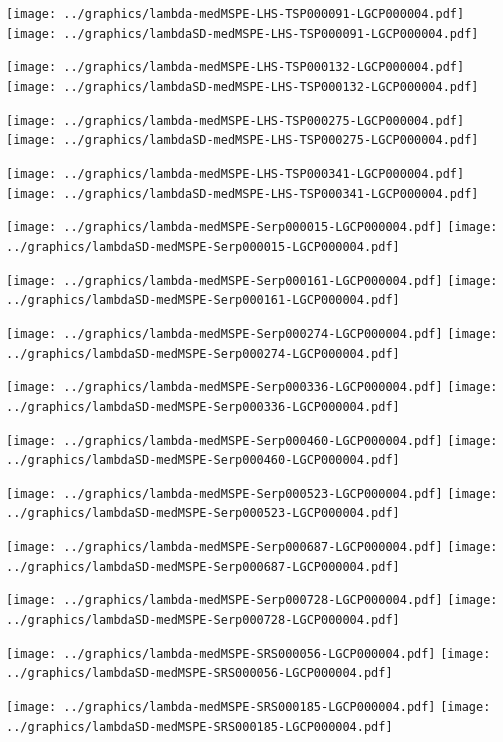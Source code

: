 \documentclass[review]{elsarticle}
\begin{document}
\texttt{[image: ../graphics/lambda-medMSPE-LHS-TSP000091-LGCP000004.pdf]}
\texttt{[image: ../graphics/lambdaSD-medMSPE-LHS-TSP000091-LGCP000004.pdf]}

\texttt{[image: ../graphics/lambda-medMSPE-LHS-TSP000132-LGCP000004.pdf]}
\texttt{[image: ../graphics/lambdaSD-medMSPE-LHS-TSP000132-LGCP000004.pdf]}

\texttt{[image: ../graphics/lambda-medMSPE-LHS-TSP000275-LGCP000004.pdf]}
\texttt{[image: ../graphics/lambdaSD-medMSPE-LHS-TSP000275-LGCP000004.pdf]}

\texttt{[image: ../graphics/lambda-medMSPE-LHS-TSP000341-LGCP000004.pdf]}
\texttt{[image: ../graphics/lambdaSD-medMSPE-LHS-TSP000341-LGCP000004.pdf]}

\texttt{[image: ../graphics/lambda-medMSPE-Serp000015-LGCP000004.pdf]}
\texttt{[image: ../graphics/lambdaSD-medMSPE-Serp000015-LGCP000004.pdf]}

\texttt{[image: ../graphics/lambda-medMSPE-Serp000161-LGCP000004.pdf]}
\texttt{[image: ../graphics/lambdaSD-medMSPE-Serp000161-LGCP000004.pdf]}

\texttt{[image: ../graphics/lambda-medMSPE-Serp000274-LGCP000004.pdf]}
\texttt{[image: ../graphics/lambdaSD-medMSPE-Serp000274-LGCP000004.pdf]}

\texttt{[image: ../graphics/lambda-medMSPE-Serp000336-LGCP000004.pdf]}
\texttt{[image: ../graphics/lambdaSD-medMSPE-Serp000336-LGCP000004.pdf]}

\texttt{[image: ../graphics/lambda-medMSPE-Serp000460-LGCP000004.pdf]}
\texttt{[image: ../graphics/lambdaSD-medMSPE-Serp000460-LGCP000004.pdf]}

\texttt{[image: ../graphics/lambda-medMSPE-Serp000523-LGCP000004.pdf]}
\texttt{[image: ../graphics/lambdaSD-medMSPE-Serp000523-LGCP000004.pdf]}

\texttt{[image: ../graphics/lambda-medMSPE-Serp000687-LGCP000004.pdf]}
\texttt{[image: ../graphics/lambdaSD-medMSPE-Serp000687-LGCP000004.pdf]}

\texttt{[image: ../graphics/lambda-medMSPE-Serp000728-LGCP000004.pdf]}
\texttt{[image: ../graphics/lambdaSD-medMSPE-Serp000728-LGCP000004.pdf]}

\texttt{[image: ../graphics/lambda-medMSPE-SRS000056-LGCP000004.pdf]}
\texttt{[image: ../graphics/lambdaSD-medMSPE-SRS000056-LGCP000004.pdf]}

\texttt{[image: ../graphics/lambda-medMSPE-SRS000185-LGCP000004.pdf]}
\texttt{[image: ../graphics/lambdaSD-medMSPE-SRS000185-LGCP000004.pdf]}
\end{document}
